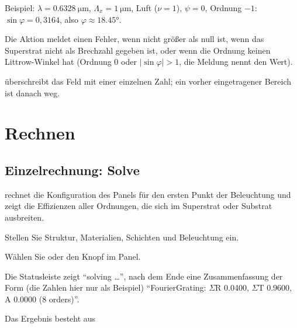 Beispiel: $\lambda = \qty{0.6328}{\micro\metre}$, $\Lambda_x = \qty{1}{\micro\metre}$, Luft
($\nu = 1$), $\psi = 0$, Ordnung $-1$: $\sin\varphi = 0{,}3164$, also
$\varphi \approx \ang{18.45}$.

Die Aktion meldet einen Fehler, wenn  nicht größer als null ist, wenn das Superstrat
nicht als Brechzahl gegeben ist, oder wenn die Ordnung keinen Littrow-Winkel hat (Ordnung 0 oder
$|\sin\varphi| > 1$, die Meldung nennt den Wert).

\begin{tipp}
 überschreibt das Feld  mit einer einzelnen Zahl; ein
vorher eingetragener Bereich ist danach weg.
\end{tipp}

\section{Rechnen}\label{sec:fg-rechnen}

\subsection{Einzelrechnung: Solve}\label{sec:fg-solve}

 rechnet die Konfiguration des Panels für den ersten Punkt der Beleuchtung und zeigt die
Effizienzen aller Ordnungen, die sich im Superstrat oder Substrat ausbreiten.

\begin{schritte}
  \item Stellen Sie Struktur, Materialien, Schichten und Beleuchtung ein.
  \item Wählen Sie  oder den Knopf  im Panel.
  \item Die Statusleiste zeigt \enquote{solving …}, nach dem Ende eine Zusammenfassung der Form (die Zahlen hier nur als Beispiel)
    \enquote{FourierGrating: $\Sigma$R 0.0400, $\Sigma$T 0.9600, A 0.0000 (8 orders)}.
\end{schritte}

Das Ergebnis besteht aus

